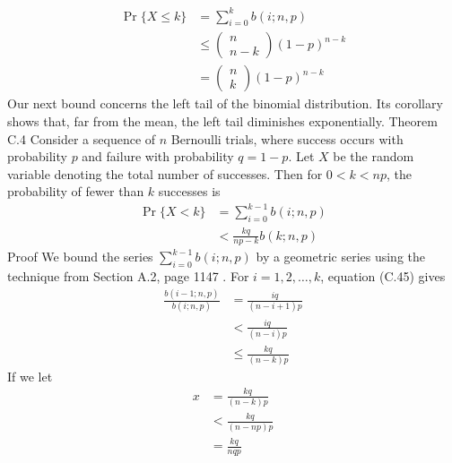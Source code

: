 \documentclass[lang=cn,newtx,10pt,scheme=chinese]{elegantbook}
\begin{document}
$$
\begin{aligned}
\operatorname{Pr}\{X \leq k\} & =\sum_{i=0}^k b(i ; n, p) \\
& \leq\left(\begin{array}{c}
n \\
n-k
\end{array}\right)(1-p)^{n-k} \\
& =\left(\begin{array}{l}
n \\
k
\end{array}\right)(1-p)^{n-k}
\end{aligned}
$$
Our next bound concerns the left tail of the binomial distribution. Its corollary shows that, far from the mean, the left tail diminishes exponentially.
Theorem C.4
Consider a sequence of $n$ Bernoulli trials, where success occurs with probability $p$ and failure with probability $q=1-p$. Let $X$ be the random variable denoting the total number of successes. Then for $0<k<n p$, the probability of fewer than $k$ successes is
$$
\begin{aligned}
\operatorname{Pr}\{X<k\} & =\sum_{i=0}^{k-1} b(i ; n, p) \\
& <\frac{k q}{n p-k} b(k ; n, p)
\end{aligned}
$$
Proof We bound the series $\sum_{i=0}^{k-1} b(i ; n, p)$ by a geometric series using the technique from Section A.2, page 1147 . For $i=1,2, \ldots, k$, equation (C.45) gives
$$
\begin{aligned}
\frac{b(i-1 ; n, p)}{b(i ; n, p)} & =\frac{i q}{(n-i+1) p} \\
& <\frac{i q}{(n-i) p} \\
& \leq \frac{k q}{(n-k) p}
\end{aligned}
$$
If we let
$$
\begin{aligned}
x & =\frac{k q}{(n-k) p} \\
& <\frac{k q}{(n-n p) p} \\
& =\frac{k q}{n q p}
\end{aligned}
$$
\end{document}
